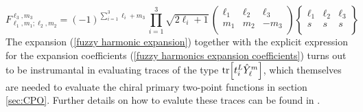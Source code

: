 %
%
\begin{equation}\label{fuzzy harmonics expansion coefficients}
F^{\ell_3, m_3}_{\ell_1, m_1; \ell_2, m_2}
=
(-1)^{\sum_{i=1}^3 \ell_i + m_3} \,
\prod_{i=1}^3 \sqrt{2 \ell_i + 1} \,
\left( \begin{array}{ccc}
\ell_1 & \ell_2 & \ell_3 \\
m_1 & m_2 & -m_3 \\
\end{array} \right)
\left\lbrace \begin{array}{ccc}
\ell_1 & \ell_2 & \ell_3 \\
s & s & s \\
\end{array} \right\rbrace
\end{equation}
%
%
The expansion (\ref{fuzzy harmonic expansion}) together with the explicit expression for the expansion coefficients (\ref{fuzzy harmonics expansion coefficients}) turns out to be instrumantal in evaluating traces of the type $\tr[t_i^L \hat{Y}^m_\ell]$, which themselves are needed to evaluate the chiral primary two-point functions in section \ref{sec:CPO}. Further details on how to evalute these traces can be found in \cite{Two-point functions in D5-D3}.

%

